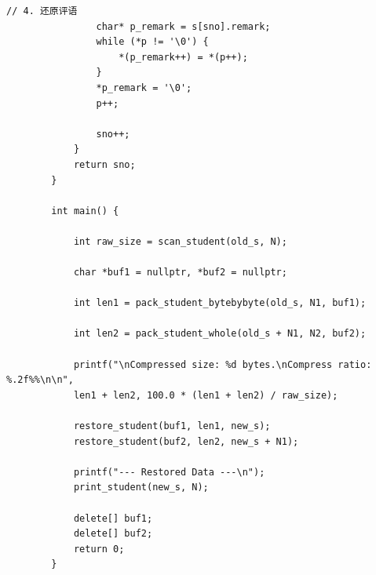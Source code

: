 \documentclass[supercite]{Experimental_Report}
\theoremstyle{definition}
\begin{document}
\begin{lstlisting}[style=commonCodeStyle, caption={task1.cpp}, label={lst:7-1}]
				// 4. 还原评语
				char* p_remark = s[sno].remark;
				while (*p != '\0') {
					*(p_remark++) = *(p++);
				}
				*p_remark = '\0';
				p++;
				
				sno++;
			}
			return sno;
		}
		
		int main() {
			
			int raw_size = scan_student(old_s, N);
			
			char *buf1 = nullptr, *buf2 = nullptr;
			
			int len1 = pack_student_bytebybyte(old_s, N1, buf1);
			
			int len2 = pack_student_whole(old_s + N1, N2, buf2); 
			
			printf("\nCompressed size: %d bytes.\nCompress ratio: %.2f%%\n\n", 
			len1 + len2, 100.0 * (len1 + len2) / raw_size);
			
			restore_student(buf1, len1, new_s);
			restore_student(buf2, len2, new_s + N1);
			
			printf("--- Restored Data ---\n");
			print_student(new_s, N);
			
			delete[] buf1;
			delete[] buf2;
			return 0;
		}
		
	\end{lstlisting}
	
	
	
	
\end{document}

